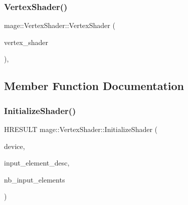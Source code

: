 \hypertarget{classmage_1_1_vertex_shader_a713f8581278ea2e5eb3010207b7e42a8}{}\label{classmage_1_1_vertex_shader_a713f8581278ea2e5eb3010207b7e42a8} 
\subsubsection{\texorpdfstring{Vertex\+Shader()}{VertexShader()}\hspace{0.1cm}{\footnotesize\ttfamily [2/2]}}
{\footnotesize\ttfamily mage\+::\+Vertex\+Shader\+::\+Vertex\+Shader (\begin{DoxyParamCaption}\item[{const \hyperlink{classmage_1_1_vertex_shader}{Vertex\+Shader} \&}]{vertex\+\_\+shader }\end{DoxyParamCaption})\hspace{0.3cm}{\ttfamily [private]}, {\ttfamily [delete]}}



\subsection{Member Function Documentation}
\hypertarget{classmage_1_1_vertex_shader_a0935c21454b9776ebe644c9290e06e54}{}\label{classmage_1_1_vertex_shader_a0935c21454b9776ebe644c9290e06e54} 
\subsubsection{\texorpdfstring{Initialize\+Shader()}{InitializeShader()}}
{\footnotesize\ttfamily H\+R\+E\+S\+U\+LT mage\+::\+Vertex\+Shader\+::\+Initialize\+Shader (\begin{DoxyParamCaption}\item[{\hyperlink{namespacemage_ae74f374780900893caa5555d1031fd79}{Com\+Ptr}$<$ I\+D3\+D11\+Device2 $>$}]{device,  }\item[{const D3\+D11\+\_\+\+I\+N\+P\+U\+T\+\_\+\+E\+L\+E\+M\+E\+N\+T\+\_\+\+D\+E\+SC $\ast$}]{input\+\_\+element\+\_\+desc,  }\item[{size\+\_\+t}]{nb\+\_\+input\+\_\+elements }\end{DoxyParamCaption})\hspace{0.3cm}{\ttfamily [protected]}}


